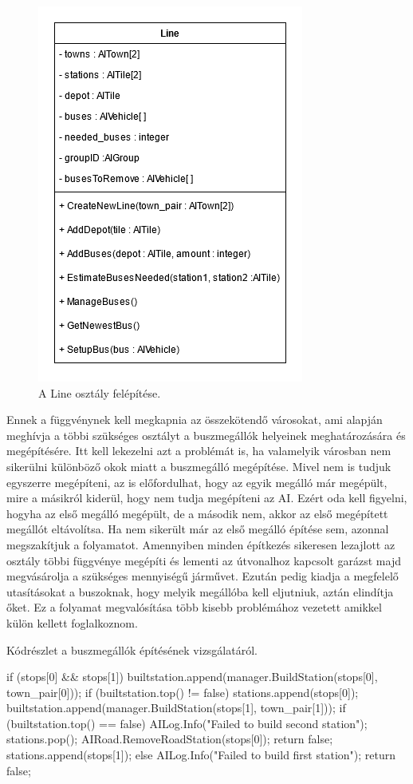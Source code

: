 \begin{figure}
	\centering
	\includegraphics[scale=0.5]{images/line.png}
	\caption{A Line osztály felépítése.}
	\label{fig:line}
\end{figure}

Ennek a függvénynek kell megkapnia az összekötendő városokat, ami alapján meghívja a többi szükséges osztályt a buszmegállók helyeinek meghatározására és megépítésére. Itt kell lekezelni azt a problémát is, ha valamelyik városban nem sikerülni különböző okok miatt a buszmegálló megépítése. Mivel nem is tudjuk egyszerre megépíteni, az is előfordulhat, hogy az egyik megálló már megépült, mire a másikról kiderül, hogy nem tudja megépíteni az AI. Ezért oda kell figyelni, hogyha az első megálló megépült, de a második nem, akkor az első megépített megállót eltávolítsa. Ha nem sikerült már az első megálló építése sem, azonnal megszakítjuk a folyamatot. Amennyiben minden építkezés sikeresen lezajlott az osztály többi függvénye megépíti és lementi az útvonalhoz kapcsolt garázst majd megvásárolja a szükséges mennyiségű járművet. Ezután pedig kiadja a megfelelő utasításokat a buszoknak, hogy melyik megállóba kell eljutniuk, aztán elindítja őket. Ez a folyamat megvalósítása több kisebb problémához vezetett amikkel külön kellett foglalkoznom.

Kódrészlet a buszmegállók építésének vizsgálatáról.
\begin{cpp}
if (stops[0] && stops[1]) {
  builtstation.append(manager.BuildStation(stops[0], town_pair[0]));
  if (builtstation.top() != false) {
    stations.append(stops[0]);
    builtstation.append(manager.BuildStation(stops[1], town_pair[1]));
    if (builtstation.top() == false) {
      AILog.Info("Failed to build second station");
      stations.pop();
      AIRoad.RemoveRoadStation(stops[0]);
      return false;
    }
    stations.append(stops[1]);
  } else {
    AILog.Info("Failed to build first station");
    return false;
  }
} 
\end{cpp}

